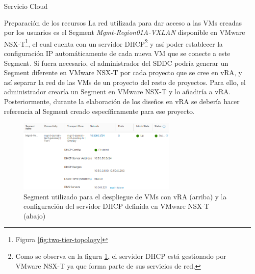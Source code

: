 \begin{subsection}{Servicio Cloud}
\begin{subsubsection}{Preparación de los recursos}
    La red utilizada para dar acceso a las VMs creadas por los usuarios es el Segment \textit{Mgmt-Region01A-VXLAN} disponible en VMware NSX-T\footnote{Figura \ref{fig:two-tier-topology}}, el cual cuenta con un servidor DHCP\footnote{Como se observa en la figura \ref{fig:topology-segment-mgmt}, el servidor DHCP está gestionado por VMware NSX-T ya que forma parte de sus servicios de red.} y así poder establecer la configuración IP automáticamente de cada nueva VM que se conecte a este Segment. Si fuera necesario, el administrador del SDDC podría generar un Segment diferente en VMware NSX-T por cada proyecto que se cree en vRA, y así separar la red de las VMs de un proyecto del resto de proyectos. Para ello, el administrador crearía un Segment en VMware NSX-T y lo añadiría a vRA. Posteriormente, durante la elaboración de los diseños en vRA se debería hacer referencia al Segment creado específicamente para ese proyecto.
    \begin{figure}[h]
        \centering
        \includegraphics[width=0.7\textwidth]{imaxes/pruebaconcepto/vrealize/segment-MGMT.png}
        \caption{Segment utilizado para el despliegue de VMs con vRA (arriba) y la configuración del servidor DHCP definida en VMware NSX-T (abajo)}
        \label{fig:topology-segment-mgmt}
    \end{figure}
    \FloatBarrier

\end{subsubsection}
\end{subsection}
